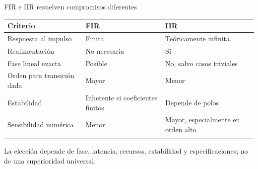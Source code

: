 \documentclass[
  ignorenonframetext,
  aspectratio=169,
  spanish,
  professionalfonts]{beamer}
\newcounter{none} %
\begin{document}
\begin{frame}{FIR e IIR resuelven compromisos diferentes}
\protect{}\label{fir-e-iir-resuelven-compromisos-diferentes}
{\def\LTcaptype{none} %
\begin{longtable}[]{@{}lll@{}}
\toprule\noalign{}
Criterio & FIR & IIR \\
\midrule\noalign{}
\endhead
Respuesta al impulso & Finita & Teóricamente infinita \\
Realimentación & No necesaria & Sí \\
Fase lineal exacta & Posible & No, salvo casos triviales \\
Orden para transición dada & Mayor & Menor \\
Estabilidad & Inherente si coeficientes finitos & Depende de polos \\
Sensibilidad numérica & Menor & Mayor, especialmente en orden alto \\
\bottomrule\noalign{}
\end{longtable}
}

\begin{tcolorbox}[enhanced jigsaw, arc=.35mm, bottomrule=.15mm, bottomtitle=1mm, breakable, colback=white, colbacktitle=quarto-callout-important-color!10!white, colframe=quarto-callout-important-color-frame, coltitle=black, left=2mm, leftrule=.75mm, opacityback=0, opacitybacktitle=0.6, rightrule=.15mm, title={Decisión}, titlerule=0mm, toprule=.15mm, toptitle=1mm]

La elección depende de fase, latencia, recursos, estabilidad y
especificaciones; no de una superioridad universal.

\end{tcolorbox}
\end{frame}
\end{document}
